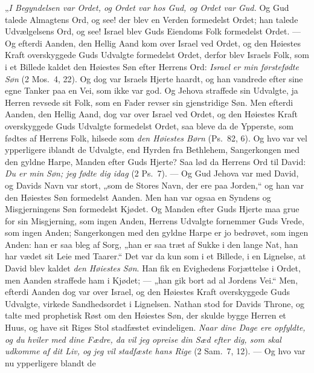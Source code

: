\documentclass[12pt,a4paper]{book}
\begin{document}
„\emph{I Begyndelsen var Ordet, og Ordet var hos Gud, og Ordet var Gud.} Og Gud
talede Almagtens Ord, og see! der blev en Verden formedelst Ordet; han talede
Udvælgelsens Ord, og see! Israel blev Guds Eiendoms Folk formedelst Ordet. ---
Og efterdi Aanden, den Hellig Aand kom over Israel ved Ordet, og den Høiestes
Kraft overskyggede Guds Udvalgte formedelst Ordet, derfor blev Israels Folk, som
i et Billede
kaldet den Høiestes Søn efter Herrens Ord: \emph{Israel er min førstefødte Søn}
(2 Mos.\ 4, 22). Og dog var Israels Hjerte haardt, og han vandrede efter sine
egne Tanker paa en Vei, som ikke var god. Og Jehova straffede sin Udvalgte, ja
Herren revsede sit Folk, som en Fader revser sin gjenstridige Søn. Men efterdi
Aanden, den Hellig Aand, dog var over Israel ved Ordet, og den Høiestes Kraft
overskyggede Guds Udvalgte formedelst Ordet, saa bleve da de Ypperste, som
fødtes af Herrens Folk, hilsede som \emph{den Høiestes Børn} (Ps.\ 82, 6). Og
hvo var vel ypperligere iblandt de Udvalgte, end Hyrden fra Bethlehem,
Sangerkongen med den
gyldne Harpe, Manden efter Guds Hjerte? Saa lød da Herrens Ord til David:
\emph{Du er min Søn; jeg fødte dig idag} (2 Ps.\ 7). --- Og Gud Jehova var med
David, og Davids Navn var stort, „som de Stores Navn, der ere paa Jorden,“ og
han var den Høiestes Søn formedelst Aanden. Men han var
ogsaa en Syndens og Misgjerningens Søn formedelst Kjødet. Og Manden efter Guds
Hjerte maa grue for sin Misgjerning, som ingen Anden, Herrens Udvalgte fornemmer
Guds Vrede, som ingen Anden; Sangerkongen med den gyldne Harpe er jo bedrøvet,
som ingen Anden: han er saa bleg af Sorg, „han er
saa træt af Sukke i den lange Nat, han har vædet sit Leie med Taarer.“ Det var
da kun som i et Billede, i en Lignelse, at David blev kaldet \emph{den Høiestes
Søn}. Han fik en Evighedens Forjættelse i Ordet, men Aanden straffede ham i
Kjødet; --- „han gik bort ad al Jordens Vei.“ Men, efterdi Aanden dog var over
Israel, og den Høiestes Kraft overskyggede Guds Udvalgte, virkede Sandhedsordet
i Lignelsen. Nathan stod for Davids Throne, og talte med prophetisk Røst om den
Høiestes Søn, der skulde bygge Herren et Huus, og have sit Riges Stol stadfæstet
evindeligen. \emph{Naar dine Dage ere opfyldte, og du hviler med dine Fædre, da
vil jeg opreise din Sæd efter dig, som skal udkomme af dit Liv, og jeg vil
stadfæste hans Rige} (2 Sam.\ 7, 12). --- Og hvo var nu ypperligere blandt de
\end{document}
